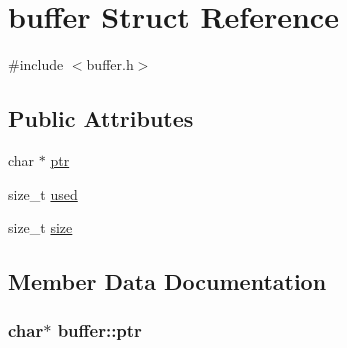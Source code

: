 \hypertarget{structbuffer}{\section{buffer Struct Reference}
\label{structbuffer}
}


{\ttfamily \#include $<$buffer.\-h$>$}

\subsection*{Public Attributes}
\begin{DoxyCompactItemize}
\item 
char $\ast$ \hyperlink{structbuffer_ad144f7902ed0594c86248e7c770f7827}{ptr}
\item 
size\-\_\-t \hyperlink{structbuffer_a4ee8efaf722ddf4773f45476eddd5a79}{used}
\item 
size\-\_\-t \hyperlink{structbuffer_abcf45ad6ca930a5656076f0d1d2343a9}{size}
\end{DoxyCompactItemize}


\subsection{Member Data Documentation}
\hypertarget{structbuffer_ad144f7902ed0594c86248e7c770f7827}{
\subsubsection[{ptr}]{\setlength{\rightskip}{0pt plus 5cm}char$\ast$ buffer\-::ptr}}\label{structbuffer_ad144f7902ed0594c86248e7c770f7827}


